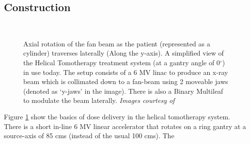 \documentclass[10pt,journal,compsoc]{IEEEtran} %
\begin{document}
  \subsection{Construction}
  \label{construction}
  \begin{figure}
    \centering
    \\
    \caption{\protect{} Axial rotation of the fan beam as the 
      patient (represented 
      as a cylinder) traverses laterally (Along the y-axis). 
      \protect{} A simplified view of the Helical 
      Tomotherapy 
      treatment system (at a gantry angle of 0$^\circ$) in use today. The 
      setup consists of a 6 MV linac to produce an x-ray beam which is 
      collimated down to a fan-beam using 2 moveable jaws (denoted as `y-jaws' 
      in the image). There is also a Binary Multileaf to modulate the beam 
      laterally. \textit{Images courtesy of \cite{Fenwick2004}}}
    \label{fig4}
  \end{figure}
  Figure \ref{fig4} show the basics of dose delivery in the helical tomotherapy 
  system. There is a short in-line 6 MV linear accelerator that rotates on a 
  ring gantry at a source-axis of 85 cms (instead of the usual 100 cms). The 
\end{document}
